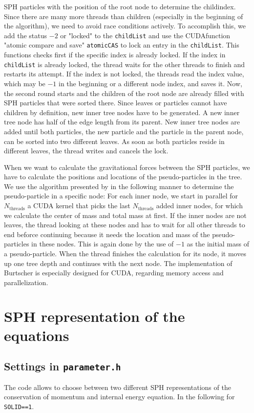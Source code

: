 \documentclass[10pt,fleqn,twoside]{article}
\begin{document}
SPH particles with the position of the root node to determine the childindex. Since there are many more threads than
children (especially in the beginning of the algorithm), we need to avoid race conditions actively. To accomplish this, we add the
status $-2$ or "locked" to the {\tt childList} and use the CUDA\-function "atomic compare and save" {\tt atomicCAS} to
lock an entry in the {\tt childList}. This functions checks first if the specific index is already locked. If the index
in {\tt childList} is already locked, the thread waits for the other threads to finish and restarts its attempt. If the
index is not locked, the threads read the index value, which may be $-1$ in the beginning or a different node index,
and saves it. Now, the second round starts and the children of the root node are already filled with SPH particles that
were sorted there. Since leaves or particles cannot have children by definition, new inner tree nodes have to be
generated. A new inner tree node has half of the edge length from its parent. New inner tree nodes are added until both
particles, the new particle and the particle in the parent node, can be sorted into two different leaves. As soon as
both particles reside in different leaves, the thread writes and cancels the lock.

When we want to calculate the gravitational forces between the SPH particles, we have to calculate the positions
and locations of the pseudo-particles in the tree. We use the algorithm presented by \cite{burtscher:2011} in the
following manner to determine the pseudo-particle in a specific node: For each inner node, we start in parallel for
$N_\mathrm{threads}$ a CUDA kernel that picks the last $N_\mathrm{threads}$ added inner nodes, for which we
calculate the center of mass and total mass at first. If the inner nodes are not leaves, the thread looking at these
nodes and has to wait for all other threads to end beforce continuing because it needs the location and mass of the
pseudo-particles in these nodes. This is again done by the use of $-1$ as the initial mass of a pseudo-particle. When the
thread finishes the calculation for its node, it moves up one tree depth and continues with the next node. The
implementation of Burtscher is especially designed for CUDA, regarding memory access and parallelization.
%
%


\section{SPH representation of the equations}
\subsection{Settings in \texttt{parameter.h}}
The code allows to choose between two different SPH representations of the conservation of momentum
and internal energy equation. In the following for \texttt{SOLID==1}.
\end{document}
